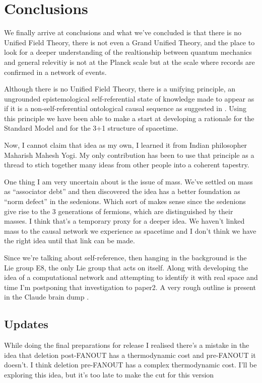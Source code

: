 \section{Conclusions}
We finally arrive at conclusions and what we've concluded is that there
is no Unified Field Theory, there is not even a Grand Unified Theory, and the place to look for
a deeper understanding of the realtionship between quantum mechanics and general relevitiy is
not at the Planck scale but at the scale where records are confirmed in a network of events.

Although there is no Unified Field Theory, there is a unifying principle, an ungrounded epistemological self-referential state of knowledge made
to appear as if it is a non-self-referential ontological causal sequence as suggested in
\autocite{small_2006}.
Using this principle we have been able to make a start at developing a rationale for the
Standard Model and for the 3+1 structure of spacetime. 

Now, I cannot claim that idea as my own, I learned it from Indian philosopher Maharish Mahesh Yogi. My 
only contribution has been to use that principle as a thread to stich together many ideas from other 
people into a coherent tapestry.

One thing I am very uncertain about is the issue of mass. We've settled on mass as \enquote{associator debt}
and then discovered the idea has a better foundation as \enquote{norm defect} in the sedenions. Which sort
of makes sense since the sedenions give rise to the 3 generations of fermions, which are distinguished by
their masses. I think that's a temporary proxy for a deeper idea. We haven't linked mass to the causal network we 
experience as spacetime and I don't think we have the right idea until that link can be made.

Since we're talking about self-reference, then hanging in the background is the Lie group E8,
the only Lie group that acts on itself. Along with developing the idea of a computational
network and attempting to identify it with real space and time I'm postponing that investigation
to paper2. A very rough outline is present in the Claude brain dump
\autocite{small2026itfrombit}.
\subsection{Updates}
While doing the final preparations for release I realised there's a mistake in the idea that
deletion post-FANOUT has a thermodynamic cost and pre-FANOUT it doesn't. I think deletion 
pre-FANOUT has a complex thermodynamic cost. I'll be exploring this idea, but it's too
late to make the cut for this version
